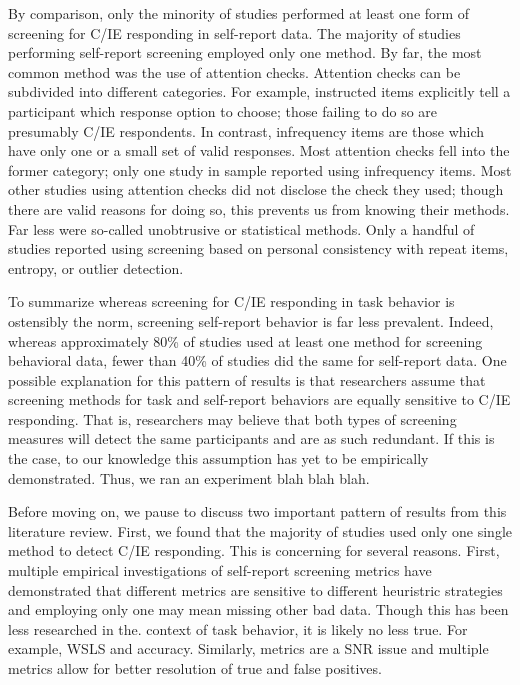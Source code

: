 \documentclass[a4paper,notitlepage,12pt]{article}
\begin{document}
By comparison, only the minority of studies performed at least one form of screening for C/IE responding in self-report data. The majority of studies performing self-report screening employed only one method. By far, the most common method was the use of attention checks. Attention checks can be subdivided into different categories. For example, instructed items explicitly tell a participant which response option to choose; those failing to do so are presumably C/IE respondents. In contrast, infrequency items are those which have only one or a small set of valid responses. Most attention checks fell into the former category; only one study in sample reported using infrequency items. Most other studies using attention checks did not disclose the check they used; though there are valid reasons for doing so, this prevents us from knowing their methods. Far less were so-called unobtrusive or statistical methods. Only a handful of studies reported using screening based on personal consistency with repeat items, entropy, or outlier detection. 

To summarize whereas screening for C/IE responding in task behavior is ostensibly the norm, screening self-report behavior is far less prevalent. Indeed, whereas approximately 80\% of studies used at least one method for screening behavioral data, fewer than 40\% of studies did the same for self-report data. One possible explanation for this pattern of results is that researchers assume that screening methods for task and self-report behaviors are equally sensitive to C/IE responding. That is, researchers may believe that both types of screening measures will detect the same participants and are as such redundant. If this is the case, to our knowledge this assumption has yet to be empirically demonstrated. Thus, we ran an experiment blah blah blah.

Before moving on, we pause to discuss two important pattern of results from this literature review. First, we found that the majority of studies used only one single method to detect C/IE responding. This is concerning for several reasons. First, multiple empirical investigations of self-report screening metrics have demonstrated that different metrics are sensitive to different heuristric strategies and employing only one may mean missing other bad data. Though this has been less researched in the. context of task behavior, it is likely no less true. For example, WSLS and accuracy. Similarly, metrics are a SNR issue and multiple metrics allow for better resolution of true and false positives. 
\end{document}
